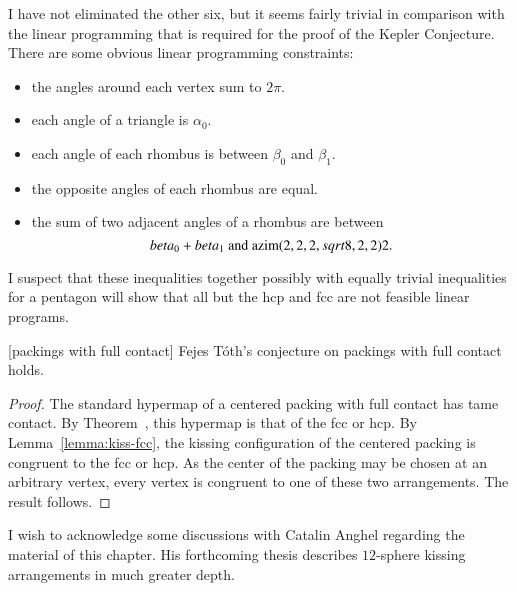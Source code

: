 \begin{note}%
I have not eliminated the other six, but it seems fairly trivial in comparison with the linear programming that is required for the proof of the Kepler Conjecture.  There are some obvious linear programming constraints:
\begin{itemize}
\item the angles around each vertex sum to $2\pi$.
\item each angle of a triangle is $\alpha_0$.
\item each angle of each rhombus is between $\beta_0$ and $\beta_1$.
\item the opposite angles of each rhombus are equal.
\item the sum of two adjacent angles of a rhombus are between
$$
beta_0 + beta_1 \hbox{ and } {\operatorname{azim}}(2,2,2,sqrt8,2,2)2.
$$
\end{itemize}
I suspect that these inequalities together possibly with equally trivial inequalities for a pentagon will show that all but the hcp and fcc are not feasible linear programs.
\end{note}

\begin{theorem}[packings with full contact]  
Fejes T\'oth's conjecture on packings with full contact holds.
\end{theorem}

\begin{proof} The standard hypermap of a centered packing with full contact has tame contact.  By Theorem~\label{lemma:fcc}, this hypermap is that of the fcc or hcp.  By Lemma~\ref{lemma:kiss-fcc}, the kissing configuration of the centered packing is congruent to the fcc or hcp.  As the center of the packing may be chosen at an arbitrary vertex, every vertex is congruent to one of these two arrangements.  The result follows.
\end{proof}

\begin{note}%
I wish to acknowledge some discussions with Catalin Anghel regarding the material of this chapter.  His forthcoming thesis describes $12$-sphere kissing arrangements in much greater depth.
\end{note}